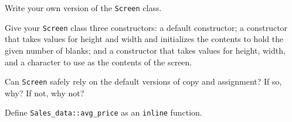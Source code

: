 %
%
\begin{question}
Write your own version of the \verb|Screen| class.
\end{question}

\begin{question}
Give your \verb|Screen| class three constructors: a default
constructor; a constructor that takes values for height and width and
initializes the contents to hold the given number of blanks; and a constructor
that takes values for height, width, and a character to use as the contents of
the screen.
\end{question}

\begin{question}
Can \verb|Screen| safely rely on the default versions of copy and
assignment? If so, why? If not, why not?
\end{question}

\begin{question}
Define \verb|Sales_data::avg_price| as an \verb|inline| function.
\end{question}

